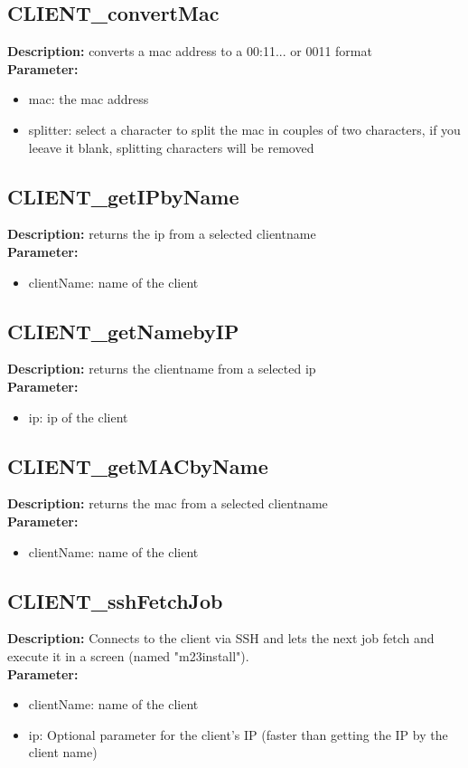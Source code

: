 \subsection{CLIENT\_convertMac}
\textbf{Description:} converts a mac address to a 00:11... or 0011 format\\
\textbf{Parameter:}
\begin{itemize}
\item mac: the mac address
\item splitter: select a character to split the mac in couples of two characters, if you leeave it blank, splitting characters will be removed
\end{itemize}

\subsection{CLIENT\_getIPbyName}
\textbf{Description:} returns the ip from a selected clientname\\
\textbf{Parameter:}
\begin{itemize}
\item clientName: name of the client
\end{itemize}

\subsection{CLIENT\_getNamebyIP}
\textbf{Description:} returns the clientname from a selected ip\\
\textbf{Parameter:}
\begin{itemize}
\item ip: ip of the client
\end{itemize}

\subsection{CLIENT\_getMACbyName}
\textbf{Description:} returns the mac from a selected clientname\\
\textbf{Parameter:}
\begin{itemize}
\item clientName: name of the client
\end{itemize}

\subsection{CLIENT\_sshFetchJob}
\textbf{Description:} Connects to the client via SSH and lets the next job fetch and execute it in a screen (named "m23install").\\
\textbf{Parameter:}
\begin{itemize}
\item clientName: name of the client
\item ip: Optional parameter for the client's IP (faster than getting the IP by the client name)
\end{itemize}

